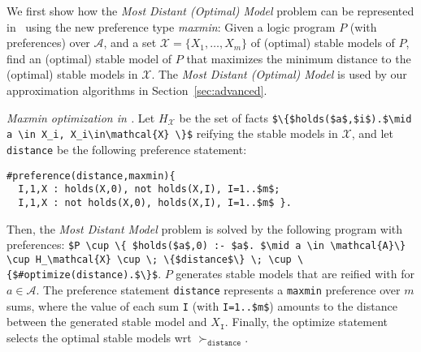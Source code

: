 %

We first show how the \emph{Most Distant (Optimal) Model} problem can be represented in \asprin\ 
using the new preference type \textit{maxmin}: %
Given a logic program $P$ (with preferences) over $\mathcal{A}$, 
and a set $\mathcal{X}=\{ X_1, \ldots, X_m \}$ of (optimal) stable models of $P$, 
find an (optimal) stable model of $P$ that 
maximizes the minimum distance to the (optimal) stable models in $\mathcal{X}$.
%
The \emph{Most Distant (Optimal) Model} is used by our approximation algorithms in Section~\ref{sec:advanced}.

\emph{Maxmin optimization in \asprin.}
%
Let $H_\mathcal{X}$ be the set of facts \lstinline[mathescape=true]!$\{$holds($a$,$i$).$\mid a \in X_i, X_i\in\mathcal{X} \}$!
reifying the stable models in $\mathcal{X}$,  
and let \lstinline!distance! be the following preference statement:
%
\begin{lstlisting}[mathescape=true]
#preference(distance,maxmin){
  I,1,X : holds(X,0), not holds(X,I), I=1..$m$;
  I,1,X : not holds(X,0), holds(X,I), I=1..$m$ }.
\end{lstlisting}
%
Then, the \emph{Most Distant Model} problem is solved by the following program with preferences:
\lstinline[mathescape=true]!$P \cup \{ $holds($a$,0) :- $a$. $\mid a \in \mathcal{A}\} \cup H_\mathcal{X} \cup \; \{$distance$\} \; \cup \{$#optimize(distance).$\}$!.
%
$P$ generates stable models that are reified with  for $a \in \mathcal{A}$. 
%
The preference statement \lstinline!distance! represents a \lstinline!maxmin! preference over $m$ sums, 
where the value of each sum \lstinline!I! (with \lstinline[mathescape=true]!I=1..$m$!)
amounts to the distance between the generated stable model and $X_\mathtt{I}$.
%
Finally, the optimize statement selects the optimal stable models wrt $\succ_\mathtt{distance}$.

